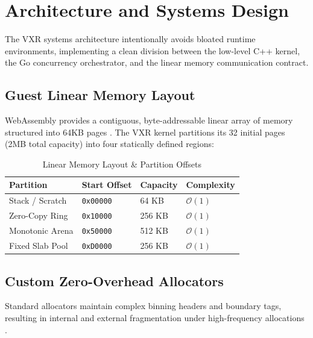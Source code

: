 \section{Architecture and Systems Design}
\label{sec:architecture}

The VXR systems architecture intentionally avoids bloated runtime environments, implementing a clean division between the low-level C++ kernel, the Go concurrency orchestrator, and the linear memory communication contract.

\subsection{Guest Linear Memory Layout}
WebAssembly provides a contiguous, byte-addressable linear array of memory structured into 64KB pages \cite{haas2017bringing}. The VXR kernel partitions its 32 initial pages (2MB total capacity) into four statically defined regions:

\begin{table}[h]
\centering
\caption{Linear Memory Layout & Partition Offsets}
\label{tab:memory_layout}
\small
\begin{tabular}{|l|l|l|l|}
\hline
\textbf{Partition} & \textbf{Start Offset} & \textbf{Capacity} & \textbf{Complexity} \\ \hline
Stack / Scratch    & \texttt{0x00000}      & 64 KB             & $\mathcal{O}(1)$ \\ \hline
Zero-Copy Ring     & \texttt{0x10000}      & 256 KB            & $\mathcal{O}(1)$ \\ \hline
Monotonic Arena    & \texttt{0x50000}      & 512 KB            & $\mathcal{O}(1)$ \\ \hline
Fixed Slab Pool    & \texttt{0xD0000}      & 256 KB            & $\mathcal{O}(1)$ \\ \hline
\end{tabular}
\end{table}

\subsection{Custom Zero-Overhead Allocators}
Standard allocators maintain complex binning headers and boundary tags, resulting in internal and external fragmentation under high-frequency allocations \cite{bonwick1994slab}.

